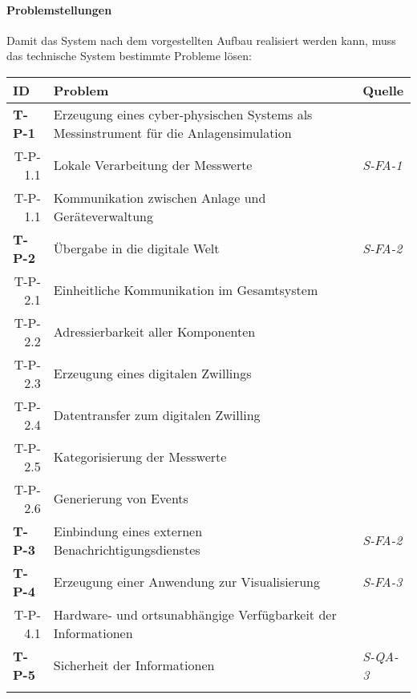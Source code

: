 \paragraph{Problemstellungen}

Damit das System nach dem vorgestellten Aufbau realisiert werden kann, muss das  technische System bestimmte Probleme lösen:

  \begin{tabularx}{\textwidth}{@{}lXp{2cm}@{}}
      \toprule
      ID                & Problem & Quelle \\
      \midrule
      \endhead
      \textbf{T-P-1}              &       Erzeugung eines cyber-physischen Systems als Messinstrument für die Anlagensimulation                       \\
      \multicolumn{1}{r}{T-P-1.1} & Lokale Verarbeitung der Messwerte  & \textit{S-FA-1}  \\
      \multicolumn{1}{r}{T-P-1.1} & Kommunikation zwischen Anlage und Geräteverwaltung  \\
      \textbf{T-P-2}              &    Übergabe in die digitale Welt    & \textit{S-FA-2} \\
      \multicolumn{1}{r}{T-P-2.1}              &       Einheitliche Kommunikation im Gesamtsystem      \\
      \multicolumn{1}{r}{T-P-2.2}              &  Adressierbarkeit aller Komponenten \\
      \multicolumn{1}{r}{T-P-2.3} & Erzeugung eines digitalen Zwillings \\
      \multicolumn{1}{r}{T-P-2.4} & Datentransfer zum digitalen Zwilling \\
      \multicolumn{1}{r}{T-P-2.5} & Kategorisierung der Messwerte \\
      \multicolumn{1}{r}{T-P-2.6} & Generierung von Events \\
      \textbf{T-P-3}              &  Einbindung eines externen Benachrichtigungsdienstes &\textit{S-FA-2}\\
      \textbf{T-P-4}              &  Erzeugung einer Anwendung zur Visualisierung & \textit{S-FA-3}\\
      \multicolumn{1}{r}{T-P-4.1} & Hardware- und ortsunabhängige Verfügbarkeit der Informationen  \\
      \textbf{T-P-5}              &  Sicherheit der Informationen & \textit{S-QA-3}\\
      \addlinespace
      \bottomrule
      \caption{Probleme aus technischer Ebene}
      \label{technik_probleme}
  \end{tabularx}




